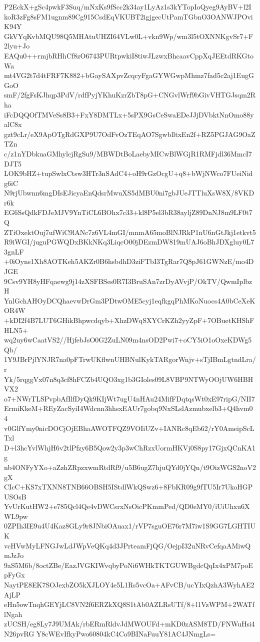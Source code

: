 P2EckX+gSc4pwkF3Suq/mNxKs9fScc2k34ay1LyAz1s3kYTopIoQyeg9AyBV+l2I
koR3zFg8sFM1ugnm89Cg915CsdEqVKUBT2igjgecUtPamTGbnO3OANWJPOviK94Y
GkVYqKvbMQU98Q5MHAtuUHZI64VLw0L+vkn9Wp/wm3l5tOXNNKgvSr7+F2lyu+Jo
EAQu0++rmjbRHhCf8zO6743PURtpwkiI8tiwJLzwxBhcaavCppXqJEEtdRKGtoWa
mt4VG2t7d4tFRF7K882+bGaySAXpvZcqcyFgaGYWGwpMhmz7fad5c2aj1EugGGoO
smF/2fgFsKJhqp3PdV/rdfPyjYKhuKzrZbT8pG+CNGvlWrf9bGivVHTGJsqm2Rha
iFcDQQOfTMVeSs8B3+FxY8DMTLx+5sPX9GsCeSwaEDeJJjDVbktNnOmo88yalC8x
gzt9cLr/eX9ApOTgRdGXP9U7OdFvOzTEqAO7SgwblltxEn2f+RZ5PGJAG9OaZTZn
c/z1nYDbkuaGMhylcjRgSu9/MBWDtBoLaebyMICwBlWGjR1RMFjdl36MmcI7DJT5
LOK9bHZ+tupSwlxCtsw3HTr3nSAdC4+oH9rGzOcgU+q8+bWjNWco7FUeiNidg6iC
N9rjUbwnn6mgDIsEJicyaEnQdsrMwuXS5dMBU0ni7gbJUeJTTluXsW8X/8VKDr6k
EG6SsQdkFDJeMJV9YnTiCL6BOhx7c33+kl8P5el3bR38ayljZ89DnNJ8m9LF0t7Q
ZTiOxektOuj7ufWiC9lANc7z6VL4mGI/mnmA65moBlNJRkP1nU6nGtJkj1etkvt5
R9iWGI/juguPGWQDxBKkNKq3LiqcO00jDEzmDW819mUAJ6oBhJDXgluy0L73gnLF
+0iOyns1Xh8AOTKeh5AKZr0B6hsbdhD3ziFTbI3TgRar7Q8pJ61GWNzE/mo4DJGE
9Csv9YH8yHFqaewg9j14zXSFBSes0R7I3BruSAn7zrDyAVvjP/OkTV/QwmIplbzH
YnlGchAHOyDCQhaevwDrGm3PDtwOME5cyj1eqfkgqPhMKoNuocs4A0bCeXeKOR4W
+kDI2f4B7LUT6GHikBhpwcdqyb+XhzDWqSXYCrKZh2yyZpF+7OBuetKHShFHLN5+
wq2uy6wCaatVS2//HjfebJsO0G2ZuLN09m4nsOD2Pwi7+oCY5iO1oOxeKDWg5Qb/
1Y9JBrPjlYNJR7na0pFTrwUKflwnUHBNulKykTARgorWnjv+sTjIBmLgtndLra/r
Yk/5rqggVx07n8q3cf8hFCZb4UQO3xg1b3GIoles09L8VBP9NTWyOOjUW6HBHVX2
o7+NWrTLSPvpbAfIlfDyQk9KIjWt7ugU4nHAu24MifFDqtqsWt0xE97ripG/NII7
ErmiKkeM+REyZacSyiI4Wdcnn3hhsxEAUr7gobq9NxSLslAzmubxelb3+Q4hvm04
v0GlfYmy0nicDOCjOjEBhaAWOTFQZ9VOIiUZv+IANRc8qEb62/rY0AmeipScLTxl
D+l3hcYvlWhjH6v2tlPfzy6B5Qow2y3p3wChRzxUormHKVj0S8py17GjxQCnKA1g
nb4ONFyYXo+aZzhZRpzxwmRtdRf9/u5B6ugZ7hjuQYd0jYQn/t9OizWGS2noV2gX
CIcC+KS7xTXNN8TNB66OBSH5IStdlWkQSwz6+8FbKR09g9fTU5Ir7UkoHGPUSOsB
YvUrKutHW2+e785Qcl4Qe4vDWCsrxNsOicPKmmPed/QD0eMY0/iUiUhxu6XWL9pw
0ZPIh3IE9u4U4Kaz8GLy9r8JNbiOAuax1/rVP7sguOE76r7M7iw1S9GG7LGHTIUK
vcHVwMyLFNGJwLdJWpVeQKq4d3JPrteamFjQG/OejpI32uNRvCefqaAMiwQmJzJo
9aS5M6b/8octZBe/EazJVGKIWvqbyPoNi6WHkTKTGUWBgdcQqIx4xPM7poEpFyGx
NaytPE8EK7SOJexbZO5kXJLOY4e5L1Rs5vcOa+AFvCB/ucYIxQzhA3WyhAE2AjLP
eHn5owTnqhGEYjLC8VN2f6ERZkXQ8S1tAb0AZLRsUTf/8+l1VzWPM+2WATflNgah
zUCSH/eg8Ly7J9UMAk/rbERmRldvJdMWOUFd+mKD0zASM8TD/FNWuHsi4N26pvRG
Y8cWEvIfkyPwo60804kC4Co9BINaFuuY81AC4JNmgLs=
